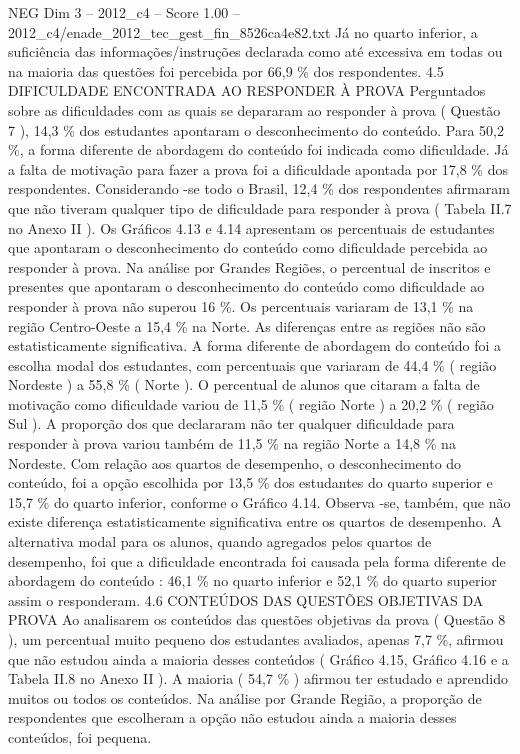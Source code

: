 \begin{textsample}{NEG Dim 3 – 2012\_c4 – Score 1.00 – 2012\_c4/enade\_2012\_tec\_gest\_fin\_8526ca4e82.txt}
Já no quarto inferior, a suficiência das informações/instruções declarada como até excessiva em todas ou na maioria das questões foi percebida por 66,9 \% dos respondentes. 4.5 DIFICULDADE ENCONTRADA AO RESPONDER À PROVA Perguntados sobre as dificuldades com as quais se depararam ao responder à prova ( Questão 7 ), 14,3 \% dos estudantes apontaram o desconhecimento do conteúdo.
Para 50,2 \%, a forma diferente de abordagem do conteúdo foi indicada como dificuldade.
Já a falta de motivação para fazer a prova foi a dificuldade apontada por 17,8 \% dos respondentes.
Considerando -se todo o Brasil, 12,4 \% dos respondentes afirmaram que não tiveram qualquer tipo de dificuldade para responder à prova ( Tabela II.7 no Anexo II ).
Os Gráficos 4.13 e 4.14 apresentam os percentuais de estudantes que apontaram o desconhecimento do conteúdo como dificuldade percebida ao responder à prova.
Na análise por Grandes Regiões, o percentual de inscritos e presentes que apontaram o desconhecimento do conteúdo como dificuldade ao responder à prova não superou 16 \%.
Os percentuais variaram de 13,1 \% na região Centro-Oeste a 15,4 \% na Norte.
As diferenças entre as regiões não são estatisticamente significativa.
A forma diferente de abordagem do conteúdo foi a escolha modal dos estudantes, com percentuais que variaram de 44,4 \% ( região Nordeste ) a 55,8 \% ( Norte ).
O percentual de alunos que citaram a falta de motivação como dificuldade variou de 11,5 \% ( região Norte ) a 20,2 \% ( região Sul ).
A proporção dos que declararam não ter qualquer dificuldade para responder à prova variou também de 11,5 \% na região Norte a 14,8 \% na Nordeste.
Com relação aos quartos de desempenho, o desconhecimento do conteúdo, foi a opção escolhida por 13,5 \% dos estudantes do quarto superior e 15,7 \% do quarto inferior, conforme o Gráfico 4.14.
Observa -se, também, que não existe diferença estatisticamente significativa entre os quartos de desempenho.
A alternativa modal para os alunos, quando agregados pelos quartos de desempenho, foi que a dificuldade encontrada foi causada pela forma diferente de abordagem do conteúdo : 46,1 \% no quarto inferior e 52,1 \% do quarto superior assim o responderam. 4.6 CONTEÚDOS DAS QUESTÕES OBJETIVAS DA PROVA Ao analisarem os conteúdos das questões objetivas da prova ( Questão 8 ), um percentual muito pequeno dos estudantes avaliados, apenas 7,7 \%, afirmou que não estudou ainda a maioria desses conteúdos ( Gráfico 4.15, Gráfico 4.16 e a Tabela II.8 no Anexo II ).
A maioria ( 54,7 \% ) afirmou ter estudado e aprendido muitos ou todos os conteúdos.
Na análise por Grande Região, a proporção de respondentes que escolheram a opção não estudou ainda a maioria desses conteúdos, foi pequena.

\end{textsample}
